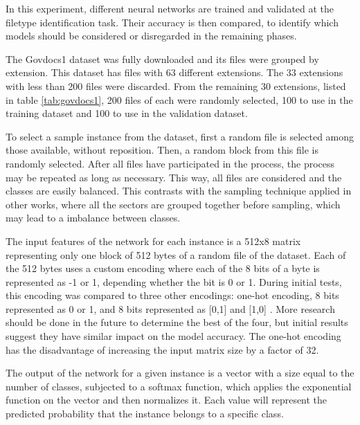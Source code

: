 In this experiment, different neural networks are trained and validated
at the filetype identification task. Their accuracy is then compared,
to identify which models should be considered or disregarded in the remaining phases.

The Govdocs1 dataset  was fully downloaded and its files were grouped by extension. This dataset has files with 63 different extensions. The 33 extensions with less than 200 files were discarded. From the remaining 30 extensions, listed in table \ref{tab:govdocs1}, 200 files of each were randomly selected, 100 to use in the training dataset and 100 to use in the validation dataset.



To select a sample instance from the dataset, first a random file is selected among those available, without reposition. Then, a random block from this file is randomly selected. After all files have participated in the process, the process may be repeated as long as necessary. This way, all files are considered and the classes are easily balanced.
This contrasts with the sampling technique applied in other works, where all the sectors are grouped together before sampling, which may lead to a imbalance between classes.

The input features of the network for each instance is a 512x8 matrix representing only one block of 512 bytes of a random file of the dataset. Each of the 512 bytes uses a custom encoding where each of the 8 bits of a byte is represented as -1 or 1, depending whether the bit is 0 or 1. During initial tests, this encoding was compared to three other encodings: one-hot encoding, 8 bits represented as 0 or 1, and 8 bits represented as [0,1] and [1,0] \cite{hiester_file_2018}. More research should be done in the future to determine the best of the four, but initial results suggest they have similar impact on the model accuracy. The one-hot encoding has the disadvantage of increasing the input matrix size by a factor of 32.

The output of the network for a given instance is a vector with a size equal to the number of classes, subjected to a softmax function, which applies the exponential function on the vector and then normalizes it. Each value will represent the predicted probability that the instance belongs to a specific class.


